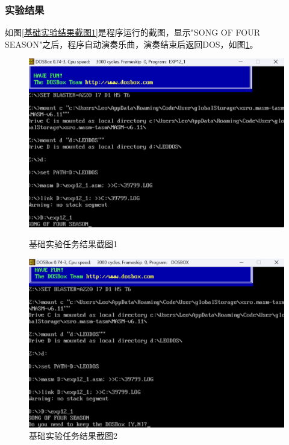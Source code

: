 \documentclass[12pt, a4paper, oneside]{ctexart}
\begin{document}
\subsubsection{实验结果}
如图\ref{基础实验结果截图1}是程序运行的截图，显示"SONG OF FOUR SEASON"之后，程序自动演奏乐曲，演奏结束后返回DOS，如图\ref{基础实验结果截图2}。
\begin{figure}[H]
    \centering
    \begin{minipage}{0.45\textwidth}
    \centering
    \includegraphics[scale=0.40]{pic/exp12-1.png}
    \caption{基础实验任务结果截图1}
    \label{基础实验结果截图1}
    \end{minipage}
    \hspace{0.05\textwidth}
    \begin{minipage}{0.45\textwidth}
    \centering
    \includegraphics[scale=0.40]{pic/exp12-1-1.png}
    \caption{基础实验任务结果截图2}
    \label{基础实验结果截图2}
    \end{minipage}
\end{figure}
\end{document}
